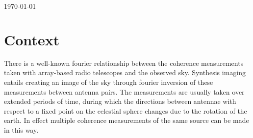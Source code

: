 \documentclass[a4paper,10pt]{article}
\begin{document}
\begin{titlepage}

{\large \today}\\[1.5cm] %
\vfill %

\end{titlepage}

\tableofcontents
\pagebreak
\listoffigures
\listoftables
\pagebreak
\section{Context}
There is a well-known fourier relationship between the coherence measurements taken with array-based radio telescopes and
the observed sky. Synthesis imaging entails creating an image of the sky through fourier inversion of these 
measurements between antenna pairs. The measurements are usually taken over extended periods of time, during which the 
directions between antennae with respect to a fixed point on the celestial sphere changes due to the rotation of the earth.
In effect multiple coherence measurements of the same source can be made in this way.
\end{document}
